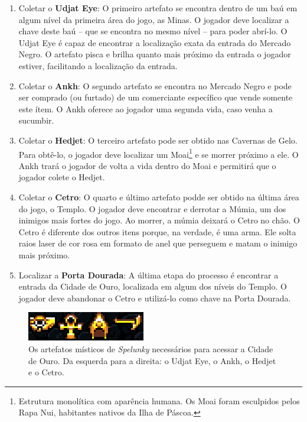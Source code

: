 \begin{enumerate}
	\item Coletar o \textbf{Udjat Eye}: O primeiro artefato se encontra dentro
	de um baú em algum nível da primeira área do jogo, as Minas. O jogador deve
	localizar a chave deste baú -- que se encontra no mesmo nível -- para poder
	abrí-lo. O Udjat Eye é capaz de encontrar a localização exata da entrada do
	Mercado Negro. O artefato pisca e brilha quanto mais próximo da entrada o
	jogador estiver, facilitando a localização da entrada.

	\item Coletar o \textbf{Ankh}: O segundo artefato se encontra no Mercado
	Negro e pode ser comprado (ou furtado) de um comerciante específico que
	vende somente este ítem. O Ankh oferece ao jogador uma segunda vida, caso
	venha a sucumbir.

	\item Coletar o \textbf{Hedjet}: O terceiro artefato pode ser obtido nas
	Cavernas de Gelo. Para obtê-lo, o jogador deve localizar um Moai\footnote{
	Estrutura monolítica com aparência humana. Os Moai foram esculpidos pelos
	Rapa Nui, habitantes nativos da Ilha de Páscoa.} e se morrer próximo a ele.
	O Ankh trará o jogador de volta a vida dentro do Moai e permitirá que o
	jogador colete o Hedjet.

	\item Coletar o \textbf{Cetro}: O quarto e último artefato podde ser obtido
	na última área do jogo, o Templo. O jogador deve encontrar e derrotar a
	Múmia, um dos inimigos mais fortes do jogo. Ao morrer, a múmia deixará o
	Cetro no chão. O Cetro é diferente dos outros itens porque, na verdade, é
	uma arma. Ele solta raios laser de cor rosa em formato de anel que perseguem
	e matam o inimigo mais próximo.

	\item Localizar a \textbf{Porta Dourada}: A última etapa do processo é
	encontrar a entrada da Cidade de Ouro, localizada em algum dos níveis do
	Templo. O jogador deve abandonar o Cetro e utilizá-lo como chave na Porta
	Dourada.
\end{enumerate}

\begin{figure}[htb!]
\centering
\includegraphics[width=.65\textwidth]{fig/spelunky-artifacts.png}
\caption{\label{fig:spelunky-artifacts}Os artefatos místicos de
\textit{Spelunky} necessários para acessar a Cidade de Ouro. Da esquerda para a
direita: o Udjat Eye, o Ankh, o Hedjet e o Cetro.}
\end{figure}

